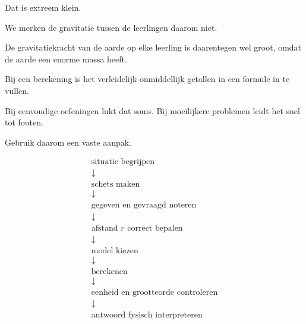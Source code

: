 \documentclass{ximera}
\begin{document}
\begin{voorbeeld}
\begin{center}
      \end{center}
Dat is extreem klein.

We merken de gravitatie tussen de leerlingen daarom niet.

De gravitatiekracht van de aarde op elke leerling is daarentegen wel
groot, omdat de aarde een enorme massa heeft.

\end{voorbeeld}




Bij een berekening is het verleidelijk onmiddellijk getallen in een
formule in te vullen.

Bij eenvoudige oefeningen lukt dat soms. Bij moeilijkere problemen
leidt het snel tot fouten.

Gebruik daarom een vaste aanpak.


\begin{center}
\[
\boxed{
\begin{array}{c}
\text{situatie begrijpen}
\\
\downarrow
\\
\text{schets maken}
\\
\downarrow
\\
\text{gegeven en gevraagd noteren}
\\
\downarrow
\\
\text{afstand }r\text{ correct bepalen}
\\
\downarrow
\\
\text{model kiezen}
\\
\downarrow
\\
\text{berekenen}
\\
\downarrow
\\
\text{eenheid en grootteorde controleren}
\\
\downarrow
\\
\text{antwoord fysisch interpreteren}
\end{array}
}
\]
\end{center}
\end{document}
